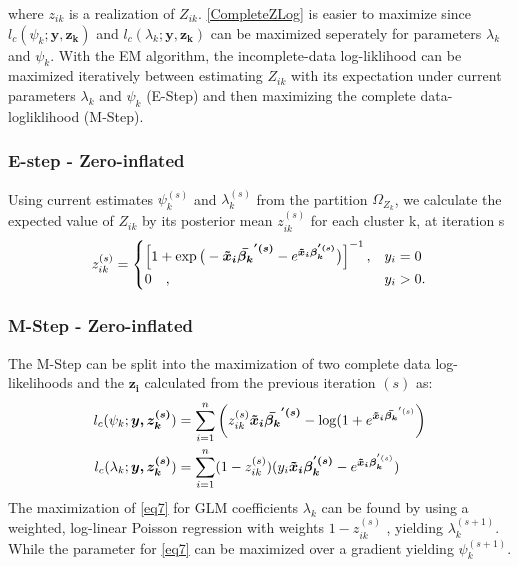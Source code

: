 \documentclass[11pt,letterpaper]{article}
\numberwithin{equation}{section}
\numberwithin{equation}{section}
\numberwithin{equation}{section}
\begin{document}
where ${z_{ik}}$ is a realization of $ Z_{ik} $. \eqref{CompleteZLog} is easier to maximize since $l_c(\psi_k;\bm{y,z_{k}})$ and $l_c(\lambda_k; \bm{y,z_k}) $ can be maximized seperately for parameters $\lambda_k$ and $\psi_k$. With the EM algorithm, the incomplete-data log-liklihood can be maximized iteratively between estimating $Z_{ik}$ with its expectation under current parameters $\lambda_k$ and $\psi_k$ (E-Step) and then maximizing the complete data-logliklihood (M-Step). 

\subsubsection{E-step -  Zero-inflated}%

Using current estimates $\psi_k^{(s)}$ and $ \lambda_k^{(s)} $ from the partition $ \Omega_{Z_k}$, we calculate the expected value of ${Z_{ik}}$ by its posterior mean ${z_{ik}^{(s)}}$ for each cluster k, at iteration s
\begin{align*}
z_{ik}^{(s)} = \begin{cases}  \left[ 1 + \exp{\big(-\bm{\bm{\tilde{x}}_i \bar{\beta_k}^{'(s)}} - e^ {\bm{\bm{\tilde{x}}_i \beta_k^{'(s)}}} \big) } \right]^{-1}, &  y_{i} = 0 \\
  0 \quad , & y_{i}> 0 .
\end{cases}
\end{align*}


\subsubsection{M-Step - Zero-inflated}
The M-Step can be split into the maximization of two complete data log-likelihoods and the $\bm{z_i}$ calculated from the previous iteration $(s)$ as: 
\begin{align} 
l_c(\psi_k;\bm{y,z_k^{(s)}}) &=\sum_{i=1}^n \left( z_{ik}^{(s)} \bm{\bm{\tilde{x}}_i \bar{\beta_k }^{'(s)}} - \log(1+ e^{\bm{ \bm{\tilde{x}}_i \bar{\beta_k }}^{'(s)}} \right)  \label{eq6}   \\
 l_c(\lambda_k; \bm{y,z_k^{(s)}}) &= \sum_{i=1}^n (1- z_{ik}^{(s)}) (y_i \bm{ \bm{\tilde{x}}_i \beta_k^{'(s)} } - e^{\bm{\bm{\tilde{x}}_i \beta_k}^{'(s)}})\label{eq7} 
 \end{align}
The maximization of \eqref{eq7} for GLM coefficients $\lambda_k$ can be found by using a weighted, log-linear Poisson regression with weights $1 - z_{ik}^{(s)}$ \citep{McCullaghNelder1989}, yielding $\lambda_k^{(s+1)}$. 
While the parameter for \eqref{eq7} can be maximized over a gradient \citep{Lambert} yielding $\psi_k^{(s+1)}$.
\end{document}
